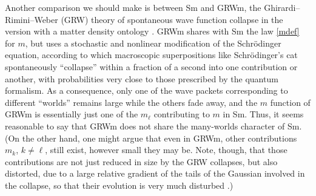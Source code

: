 \documentclass[12pt]{article}
\begin{document}
Another comparison we should make is between Sm and GRWm, the Ghirardi--Rimini--Weber (GRW) theory of spontaneous wave function collapse \cite{GRW86,Bell87} in the version with a matter density ontology \cite{BGG95,Gol98}. GRWm shares with Sm the law \eqref{mdef} for $m$, but uses a stochastic and nonlinear modification of the Schr\"odinger equation, according to which macroscopic superpositions like Schr\"odinger's cat spontaneously ``collapse'' within a fraction of a second into one contribution or another, with probabilities very close to those prescribed by the quantum formalism. As a consequence, only one of the wave packets corresponding to different ``worlds'' remains large while the others fade away, and the $m$ function of GRWm is essentially just one of the $m_\ell$ contributing to $m$ in Sm. Thus, it seems reasonable to say that GRWm does not share the many-worlds character of Sm. (On the other hand, one might argue that even in GRWm, other contributions $m_k$, $k\neq \ell$, still exist, however small they may be. Note, though, that those contributions are not just reduced in size by the GRW collapses, but also distorted, due to a large relative gradient of the tails of the Gaussian involved in the collapse, so that their evolution is  very much disturbed \cite{WM06}.)



\end{document}
